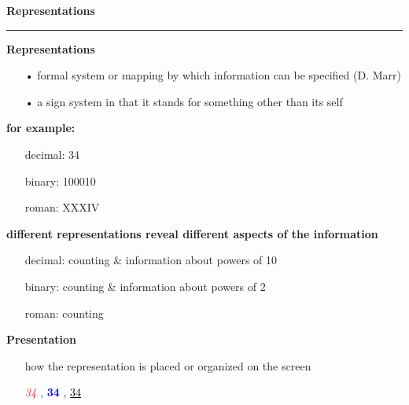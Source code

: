\documentclass[pdf]{beamer}
\begin{document}

\begin{frame}
{\textbf{Representations}}{\textcolor{red}{\rule{12cm}{1.2pt}}}

\textbf{Representations}
\begin{itemize}
\item[\textcolor{black}{•}] formal system or mapping by which information can be specified  (D. Marr)
\item[\textcolor{black}{•}] a sign system in that it stands for something other than its self
\end{itemize}
\textbf{for example:}
\begin{itemize}
\item[] decimal: 34
\item[] binary: 100010
\item[] roman: XXXIV
\end{itemize}
\textbf{different representations reveal different aspects of the information}
\begin{itemize}
\item[] decimal: counting \& information about powers of 10
\item[] binary: counting \& information about powers of 2
\item[] roman: counting
\end{itemize}
\textbf{Presentation}
\begin{itemize}
\item[] how the representation is placed or organized on the screen 
\item[] \textsl{\textcolor{red}{\LARGE 34 \LARGE} } , { \textcolor{blue}{\LARGE \textbf{34}   \LARGE}, \textcolor{black}{\LARGE \underline{34} \LARGE}}
\end{itemize}


\end{frame}



\end{document}
